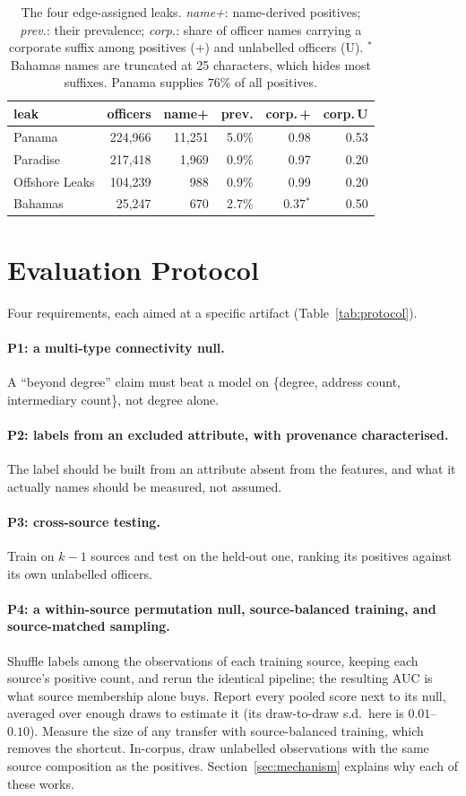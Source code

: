 \documentclass[11pt]{article}
\begin{document}
\begin{table}[t]\centering\small\setlength{\tabcolsep}{4pt}
\begin{tabular}{lrrrrr}
\toprule
leak & officers & name+ & prev. & corp.\,+ & corp.\,U\\
\midrule
Panama & 224{,}966 & 11{,}251 & 5.0\% & 0.98 & 0.53\\
Paradise & 217{,}418 & 1{,}969 & 0.9\% & 0.97 & 0.20\\
Offshore Leaks & 104{,}239 & 988 & 0.9\% & 0.99 & 0.20\\
Bahamas & 25{,}247 & 670 & 2.7\% & 0.37$^*$ & 0.50\\
\bottomrule
\end{tabular}
\caption{The four edge-assigned leaks. \emph{name+}: name-derived positives;
\emph{prev.}: their prevalence; \emph{corp.}: share of officer names carrying a
corporate suffix among positives (+) and unlabelled officers (U). $^*$Bahamas names
are truncated at 25 characters, which hides most suffixes. Panama supplies $76\%$
of all positives.}\label{tab:data}\end{table}

\section{Evaluation Protocol}\label{sec:protocol}
Four requirements, each aimed at a specific artifact (Table~\ref{tab:protocol}).
\paragraph{P1: a multi-type connectivity null.} A ``beyond degree'' claim must
beat a model on \{degree, address count, intermediary count\}, not degree alone.
\paragraph{P2: labels from an excluded attribute, with provenance characterised.}
The label should be built from an attribute absent from the features, and what it
actually names should be measured, not assumed.
\paragraph{P3: cross-source testing.} Train on $k\!-\!1$ sources and test on the
held-out one, ranking its positives against its own unlabelled officers.
\paragraph{P4: a within-source permutation null, source-balanced training, and source-matched sampling.}
Shuffle labels among the observations of each training source, keeping each
source's positive count, and rerun the identical pipeline; the resulting AUC is what
source membership alone buys. Report every pooled score next to its null, averaged
over enough draws to estimate it (its draw-to-draw s.d.\ here is $0.01$--$0.10$).
Measure the size of any transfer with source-balanced training, which removes the
shortcut. In-corpus, draw unlabelled observations with the same source composition
as the positives. Section~\ref{sec:mechanism} explains why each of these works.
\end{document}
